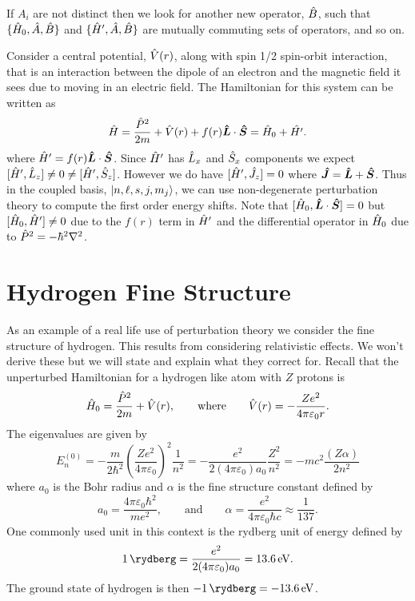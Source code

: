     If \(A_i\) are not distinct then we look for another new operator, \(\hat{B}\), such that \(\{\hat{H}_0, \hat{A}, \hat{B}\}\) and \(\{\hat{H}', \hat{A}, \hat{B}\}\) are mutually commuting sets of operators, and so on.
    
    \begin{example}
        Consider a central potential, \(\hat{V}(r)\), along with spin 1/2 spin-orbit interaction, that is an interaction between the dipole of an electron and the magnetic field it sees due to moving in an electric field.
        The Hamiltonian for this system can be written as
        \[\hat{H} = \frac{\hat{P}^2}{2m} + \hat{V}(r) + f(r)\bm{\hat{L}}\cdot\bm{\hat{S}} = \hat{H}_0 + \hat{H'}.\]
        where \(\hat{H}' = f(r)\bm{\hat{L}}\cdot\bm{\hat{S}}\).
        Since \(\hat{H}'\) has \(\hat{L}_x\) and \(\hat{S}_x\) components we expect \([\hat{H}', \hat{L}_z] \ne 0 \ne [\hat{H}', \hat{S}_z]\).
        However we do have \([\hat{H}', \hat{J}_z] = 0\) where \(\bm{\hat{J}} = \bm{\hat{L}} + \bm{\hat{S}}\).
        Thus in the coupled basis, \(\vert {n, \ell, s, j, m_j} \rangle\), we can use non-degenerate perturbation theory to compute the first order energy shifts.
        Note that \([\hat{H}_0, \bm{\hat{L}}\cdot\bm{\hat{S}}] = 0\) but \([\hat{H}_0, \hat{H}']\ne 0\) due to the \(f(r)\) term in \(\hat{H}'\) and the differential operator in \(\hat{H}_0\) due to \(\hat{P}^2 = -\hbar^2\nabla^2\).
    \end{example}
    
    \section{Hydrogen Fine Structure}
    As an example of a real life use of perturbation theory we consider the fine structure of hydrogen.
    This results from considering relativistic effects.
    We won't derive these but we will state and explain what they correct for.
    Recall that the unperturbed Hamiltonian for a hydrogen like atom with \(Z\) protons is
    \[\hat{H}_0 = \frac{\hat{P}^2}{2m} + \hat{V}(r), \qquad\text{where}\qquad \hat{V}(r) = -\frac{Ze^2}{4\pi\varepsilon_0r}.\]
    The eigenvalues are given by
    \[E_n^{(0)} = -\frac{m}{2\hbar^2}\left(\frac{Ze^2}{4\pi\varepsilon_0}\right)^2 \frac{1}{n^2} = -\frac{e^2}{2(4\pi\varepsilon_0)a_0}\frac{Z^2}{n^2} = -mc^2\frac{(Z\alpha)}{2n^2}\]
    where \(a_0\) is the Bohr radius and \(\alpha\) is the fine structure constant defined by
    \[a_0 = \frac{4\pi\varepsilon_0\hbar^2}{me^2}, \qquad\text{and}\qquad \alpha = \frac{e^2}{4\pi\varepsilon_0\hbar c} \approx \frac{1}{137}.\]
    One commonly used unit in this context is the rydberg unit of energy defined by
    \[\SI{1}{\rydberg} = \frac{e^2}{2(4\pi\varepsilon_0)a_0} = \SI{13.6}{\electronvolt}.\]
    The ground state of hydrogen is then \(\SI{-1}{\rydberg} = \SI{-13.6}{\electronvolt}\).
    
